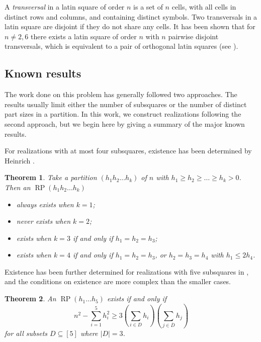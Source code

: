 \documentclass[preprint,nonatbib]{elsarticle}
\DeclareMathOperator{\LS}{RP}
\newtheorem{theorem}{Theorem}[section]
\theoremstyle{definition}
\numberwithin{equation}{section}
\begin{document}
A \emph{transversal} in a latin square of order $n$ is a set of $n$ cells, with all cells in distinct rows and columns, and containing distinct symbols. Two transversals in a latin square are disjoint if they do not share any cells. It has been shown that for $n\neq 2,6$ there exists a latin square of order $n$ with $n$ pairwise disjoint transversals, which is equivalent to a pair of orthogonal latin squares (see \cite{bose1960further}).



\subsection{Known results}

The work done on this problem has generally followed two approaches. The results usually limit either the number of subsquares or the number of distinct part sizes in a partition. In this work, we construct realizations following the second approach, but we begin here by giving a summary of the major known results.

For realizations with at most four subsquares, existence has been determined by Heinrich \cite{heinrich2006latin}.

\begin{theorem}
\label{thm: small n squares}
    Take a partition $(h_1h_2\dots h_k)$ of $n$ with $h_1\geq h_2\geq \dots\geq h_k > 0$. Then an $\LS(h_1h_2\dots h_k)$
    \begin{itemize}
        \item always exists when $k=1$;
        \item never exists when $k=2$;
        \item exists when $k=3$ if and only if $h_1=h_2=h_3$;
        \item exists when $k=4$ if and only if $h_1=h_2=h_3$, or $h_2=h_3=h_4$ with $h_1\leq 2h_4$.
    \end{itemize}
\end{theorem}

Existence has been further determined for realizations with five subsquares in \cite{kemp2024latin}, and the conditions on existence are more complex than the smaller cases.

\begin{theorem}
\label{thm: 5 subsquares}
    An $\LS(h_1\dots h_5)$ exists if and only if 
    \begin{equation*}
        n^2 - \sum_{i=1}^5h_i^2\geq 3\left( \sum_{i\in D}h_i\right)\left(\sum_{j\in\overline{D}}h_j\right)
    \end{equation*}
    for all subsets $D\subseteq[5]$ where $|D| = 3$.
\end{theorem}
\end{document}
